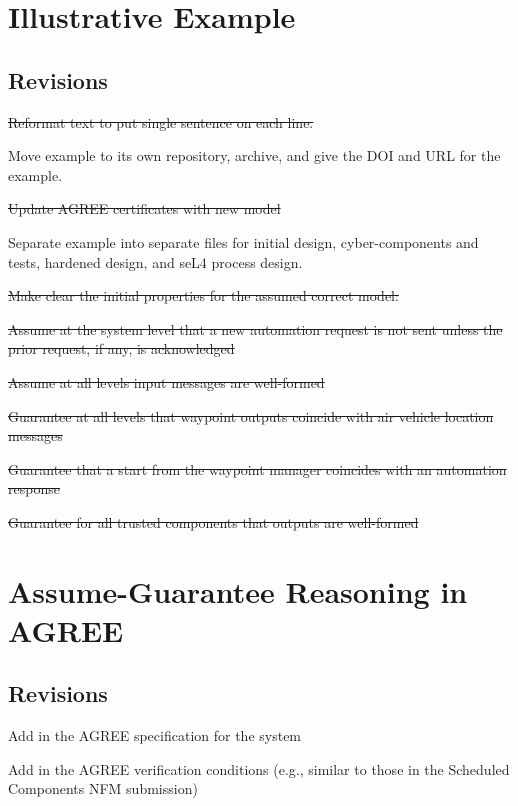\documentclass[global,twocolumn]{svjour}
\begin{document}
\section{Illustrative Example}
\label{sec:example}


\subsection{Revisions}
\begin{compactitem}
  \item \sout{Reformat text to put single sentence on each line.}
  \item Move example to its own repository, archive, and give the DOI and URL for the example.
  \item \sout{Update AGREE certificates with new model}
  \item Separate example into separate files for initial design, cyber-components and tests, hardened design, and seL4 process design.
  \item \sout{Make clear the initial properties for the assumed correct model:}
    \begin{compactitem}
      \item \sout{Assume at the system level that a new automation request is not sent unless the prior request, if any, is acknowledged}
      \item \sout{Assume at all levels input messages are well-formed}
      \item \sout{Guarantee at all levels that waypoint outputs coincide with air vehicle location messages}
      \item \sout{Guarantee that a start from the waypoint manager coincides with an automation response}
      \item \sout{Guarantee for all trusted components that outputs are well-formed}
    \end{compactitem}
\end{compactitem}

\section{Assume-Guarantee Reasoning in AGREE}
\label{sec:agree}


\subsection{Revisions}
\begin{compactitem}
  \item Add in the AGREE specification for the system
  \item Add in the AGREE verification conditions (e.g., similar to those in the Scheduled Components NFM submission)
\end{compactitem}
\end{document}

